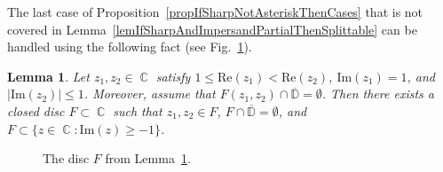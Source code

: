 \documentclass{amsart}
\numberwithin{equation}{section}
\newtheorem{lemma}[theorem]{Lemma}
\theoremstyle{definition}
\theoremstyle{remark}
\DeclareMathOperator{\CC}{\mathbb C}
\DeclareMathOperator{\DD}{\mathbb D}
\begin{document}
	The last case of Proposition~\ref{propIfSharpNotAsteriskThenCases} that is not covered in Lemma~\ref{lemIfSharpAndImpersandPartialThenSplittable} can be handled using the following fact (see Fig.~\ref{figDeformedCircleInStrip}).
	\FloatBarrier
	\begin{lemma}\label{lemDeformedCircleInImpersandCase}
		Let $z_1, z_2 \in \CC$ satisfy $1 \le \mathrm{Re}(z_1) < \mathrm{Re}(z_2)$, $\mathrm{Im}(z_1) = 1$, and $|\mathrm{Im}(z_2)| \le 1$. Moreover, assume that $F(z_1, z_2) \cap \overline{\mathbb D} = \emptyset$. Then there exists a closed disc $F \subset \CC$ such that $z_1, z_2 \in F$, $F \cap \overline{\mathbb D} = \emptyset$, and $F \subset \{z \in \CC: \mathrm{Im}(z) \ge -1\}$.
	\end{lemma}
	
	
	\begin{figure}
		\caption{The disc $F$ from Lemma~\ref{lemDeformedCircleInImpersandCase}.}
		\label{figDeformedCircleInStrip}
	\end{figure}
\end{document}
